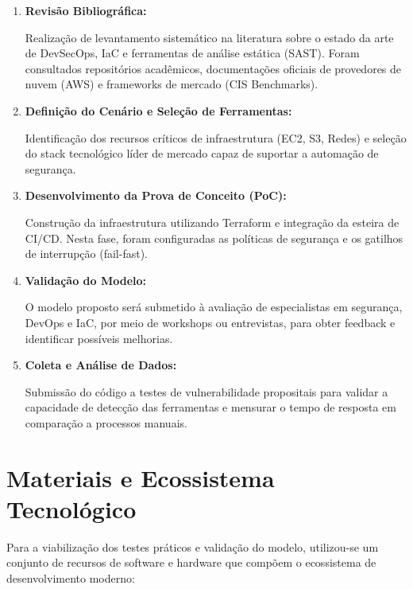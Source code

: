 \begin{enumerate}
    \item \textbf{Revisão Bibliográfica:}
    
    Realização de levantamento sistemático na literatura sobre o estado da arte de DevSecOps, IaC e ferramentas de análise estática (SAST). Foram consultados repositórios acadêmicos, documentações oficiais de provedores de nuvem (AWS) e frameworks de mercado (CIS Benchmarks).
    
    \item \textbf{Definição do Cenário e Seleção de Ferramentas:}
    
    Identificação dos recursos críticos de infraestrutura (EC2, S3, Redes) e seleção do stack tecnológico líder de mercado capaz de suportar a automação de segurança.
    
    \item \textbf{Desenvolvimento da Prova de Conceito (PoC):}
    
    Construção da infraestrutura utilizando Terraform e integração da esteira de CI/CD. Nesta fase, foram configuradas as políticas de segurança e os gatilhos de interrupção (fail-fast).
    
    \item \textbf{Validação do Modelo:}
    
    O modelo proposto será submetido à avaliação de especialistas em segurança, DevOps e IaC, por meio de workshops ou entrevistas, para obter feedback e identificar possíveis melhorias.
    
    \item \textbf{Coleta e Análise de Dados:}
    
    Submissão do código a testes de vulnerabilidade propositais para validar a capacidade de detecção das ferramentas e mensurar o tempo de resposta em comparação a processos manuais.
    
\end{enumerate}


\section{Materiais e Ecossistema Tecnológico}
Para a viabilização dos testes práticos e validação do modelo, utilizou-se um conjunto de recursos de software e hardware que compõem o ecossistema de desenvolvimento moderno:

